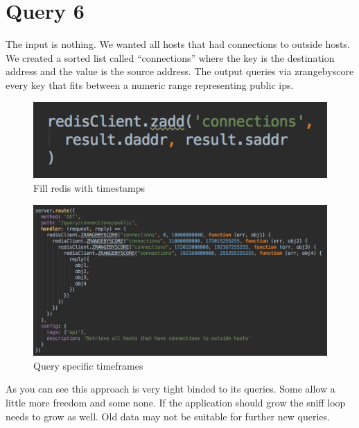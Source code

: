 \section{Query 6}
The input is nothing. We wanted all hosts that had connections to outside hosts. We created a sorted list called “connections” where the key is the destination address and the value is the source address. The output queries via zrangebyscore every key that fits between a numeric range representing public ips.

  \begin{figure}[htb!]
	\centerline{\includegraphics[width=1.0\textwidth]{resources/solution2-12.png}}
	\caption{Fill redis with timestamps}
	\label{query6}
\end{figure}

\begin{figure}[htb!]
	\centerline{\includegraphics[width=1.0\textwidth]{resources/solution2-13.png}}
	\caption{Query specific timeframes}
	\label{query66}
\end{figure}

As you can see this approach is very tight binded to its queries. Some allow a little more freedom and some none. If the application should grow the sniff loop needs to grow as well. Old data may not be suitable for further new queries.

